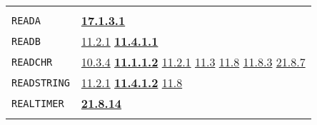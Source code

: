 \documentclass[a4paper,]{article}
\begin{document}
\begin{longtable}[]{@{}ll@{}}
\begin{minipage}[t]{0.70\columnwidth}
\end{minipage}\tabularnewline
\begin{minipage}[t]{0.24\columnwidth}\raggedright\strut
\texttt{READA}\strut
\end{minipage} & \begin{minipage}[t]{0.70\columnwidth}\raggedright\strut
\textbf{\href{17-macro-operations.md\#17131-read-finally}{17.1.3.1}}\strut
\end{minipage}\tabularnewline
\begin{minipage}[t]{0.24\columnwidth}\raggedright\strut
\texttt{READB}\strut
\end{minipage} & \begin{minipage}[t]{0.70\columnwidth}\raggedright\strut
\href{11-input-output.md\#1121-open}{11.2.1} \textbf{\href{11-input-output.md\#11411-readb}{11.4.1.1}}\strut
\end{minipage}\tabularnewline
\begin{minipage}[t]{0.24\columnwidth}\raggedright\strut
\texttt{READCHR}\strut
\end{minipage} & \begin{minipage}[t]{0.70\columnwidth}\raggedright\strut
\href{10-looping.md\#1034-only-two-arguments}{10.3.4} \textbf{\href{11-input-output.md\#11112-readchr}{11.1.1.2}}
\href{11-input-output.md\#1121-open}{11.2.1} \href{11-input-output.md\#113-end-of-file-routine}{11.3}
\href{11-input-output.md\#118-terminal-channels}{11.8} \href{11-input-output.md\#1183-tyi}{11.8.3}
\href{21-interrupts.md\#2187-blocked}{21.8.7}\strut
\end{minipage}\tabularnewline
\begin{minipage}[t]{0.24\columnwidth}\raggedright\strut
\texttt{READSTRING}\strut
\end{minipage} & \begin{minipage}[t]{0.70\columnwidth}\raggedright\strut
\href{11-input-output.md\#1121-open}{11.2.1} \textbf{\href{11-input-output.md\#11412-readstring}{11.4.1.2}}
\href{11-input-output.md\#118-terminal-channels}{11.8}\strut
\end{minipage}\tabularnewline
\begin{minipage}[t]{0.24\columnwidth}\raggedright\strut
\texttt{REALTIMER}\strut
\end{minipage} & \begin{minipage}[t]{0.70\columnwidth}\raggedright\strut
\textbf{\href{21-interrupts.md\#21814-runt-and-realt}{21.8.14}}\strut
\end{minipage}\tabularnewline
\begin{minipage}[t]{0.24\columnwidth}\raggedright\strut

\end{minipage}
\end{longtable}
\end{document}
